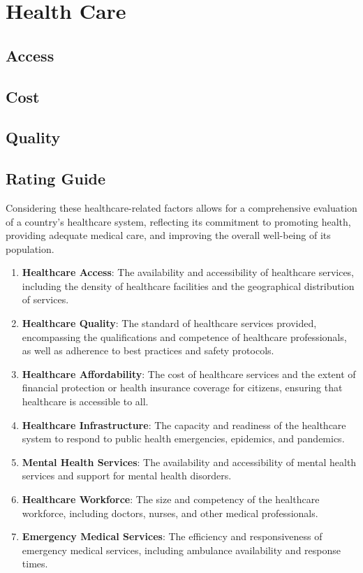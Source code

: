 \section{Health Care}

\subsection{Access}

\subsection{Cost}

\subsection{Quality}

\subsection{Rating Guide}
Considering these healthcare-related factors allows for a
comprehensive evaluation of a country's healthcare system,
reflecting its commitment to promoting health, providing
adequate medical care, and improving the overall well-being
of its population.
\begin{enumerate}
  \item \textbf{Healthcare Access}: The availability and
  accessibility of healthcare services, including the
  density of healthcare facilities and the geographical
  distribution of services.
  
  \item \textbf{Healthcare Quality}: The standard of
  healthcare services provided, encompassing the
  qualifications and competence of healthcare professionals,
  as well as adherence to best practices and safety protocols.
  
  \item \textbf{Healthcare Affordability}: The cost of
  healthcare services and the extent of financial
  protection or health insurance coverage for citizens,
  ensuring that healthcare is accessible to all.
  
  \item \textbf{Healthcare Infrastructure}: The capacity
  and readiness of the healthcare system to respond to
  public health emergencies, epidemics, and pandemics.
  
  \item \textbf{Mental Health Services}: The availability
  and accessibility of mental health services and support
  for mental health disorders.
  
  \item \textbf{Healthcare Workforce}: The size and competency
  of the healthcare workforce, including doctors, nurses, and
  other medical professionals.
  
  \item \textbf{Emergency Medical Services}: The efficiency
  and responsiveness of emergency medical services, including
  ambulance availability and response times.
\end{enumerate}

